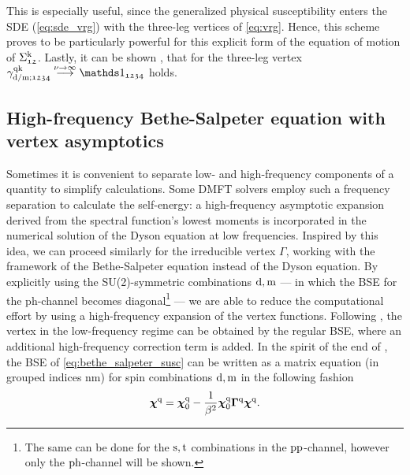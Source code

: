 \documentclass[../../main.tex]{subfiles}
\begin{document}
This is especially useful, since the generalized physical susceptibility enters the SDE (\ref{eq:sde_vrg}) with the three-leg vertices of \eqref{eq:vrg}. Hence, this scheme proves to be particularly powerful \cite{Worm2023a, Kitatani2022} for this explicit form of the equation of motion of $\Sigma_{\mathfrak{12}}^{\text{k}}$. Lastly, it can be shown \cite{Katanin2009}, that for the three-leg vertex $\gamma_{\dens/\magn;\mathfrak{1234}}^{\q\k}\overset{\nu\to\infty}{\longrightarrow}\unity_{\mathfrak{1234}}$ holds.

\subsection{High-frequency Bethe-Salpeter equation with vertex asymptotics}

Sometimes it is convenient to separate low- and high-frequency components of a quantity to simplify calculations. Some DMFT solvers \cite{Parragh2010} employ such a frequency separation to calculate the self-energy: a high-frequency asymptotic expansion derived from the spectral function's lowest moments is incorporated in the numerical solution of the Dyson equation at low frequencies. Inspired by this idea, we can proceed similarly for the irreducible vertex $\Gamma$, working with the framework of the Bethe-Salpeter equation instead of the Dyson equation. By explicitly using the SU(2)-symmetric combinations $\text{d}, \text{m}$ --- in which the BSE for the ph-channel becomes diagonal\footnote{The same can be done for the $\text{s}, \text{t}$ combinations in the $\text{pp}$-channel, however only the $\text{ph}$-channel will be shown.} --- we are able to reduce the computational effort by using a high-frequency expansion of the vertex functions. Following \cite{Kunes2011, Hummel2014, Tagliavini2018}, the vertex in the low-frequency regime can be obtained by the regular BSE, where an additional high-frequency correction term is added. In the spirit of the end of , the BSE of \eqref{eq:bethe_salpeter_susc} can be written as a matrix equation (in grouped indices $\text{nm}$) for spin combinations $\text{d}, \text{m}$ in the following fashion
\begin{align}\label{eq:bse_matrix}
	\bm{\chi}^{\text{q}}=\bm{\chi}_{0}^{\text{q}}-\frac{1}{\beta^2} \bm{\chi}_{0}^{\text{q}}\bm{\Gamma}^{\text{q}}\bm{\chi}^{\text{q}}.
\end{align}
\end{document}
